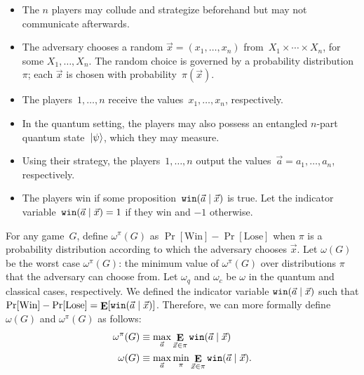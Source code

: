 







\begin{itemize}
\item{The $n$ players may collude and strategize beforehand but may not communicate afterwards.}
\item{The adversary chooses a random $\vec{x}=(x_1, \ldots, x_n)$ from~$X_1 \times \cdots \times X_n$, for some $X_1, \ldots, X_n$. The random choice is governed by a probability distribution~$\pi$; each $\vec{x}$ is chosen with probability~$\pi(\vec{x})$.}
\item{The players~$1, \ldots, n$ receive the values~$x_1, \ldots, x_n$, respectively.}
\item{In the quantum setting, the players may also possess an entangled $n$-part quantum state~$\ket{\psi}$, which they may measure.}
\item{Using their strategy, the players~$1, \ldots, n$ output the values~$\vec{a} = a_1, \ldots, a_n$, respectively.}
\item{The players win if some proposition~$\texttt{win}(\vec{a} \nobreak\mid\nobreak \vec{x})$ is true. Let the indicator variable~$\texttt{win}(\vec{a} \nobreak\mid\nobreak \vec{x}) = 1$ if they win and $-1$ otherwise.}
\end{itemize}

For any game~$G$, define $\omega^\pi(G)$ as $\Pr[\textrm{Win}] - \Pr[\textrm{Lose}]$ when $\pi$ is a probability distribution according to which the adversary chooses $\vec{x}$. Let $\omega(G)$ be the worst case $\omega^\pi(G)$: the minimum value of $\omega^\pi(G)$ over distributions $\pi$ that the adversary can choose from. Let $\omega_q$ and $\omega_c$ be $\omega$ in the quantum and classical cases, respectively. We defined the indicator variable $\texttt{win}(\vec{a}\nobreak\mid\nobreak\vec{x})$ such that $\Pr[\textrm{Win}] - \Pr[\textrm{Lose}] = \mathop{\mathbf{E}}[ \texttt{win}(\vec{a}\nobreak\mid\nobreak\vec{x}) ]$. Therefore, we can more formally define $\omega(G)$ and $\omega^\pi(G)$ as follows:
\begin{align*}
	\omega^\pi(G) &\equiv \max_{\vec{a}} \mathop{\mathbf{E}}_{\vec{x} \in \pi} \texttt{win}(\vec{a}\nobreak\mid\nobreak\vec{x}) \\
	\omega(G) &\equiv \max_{\vec{a}} \min_\pi \mathop{\mathbf{E}}_{\vec{x} \in \pi} \texttt{win}(\vec{a}\nobreak\mid\nobreak\vec{x}).
\end{align*}

